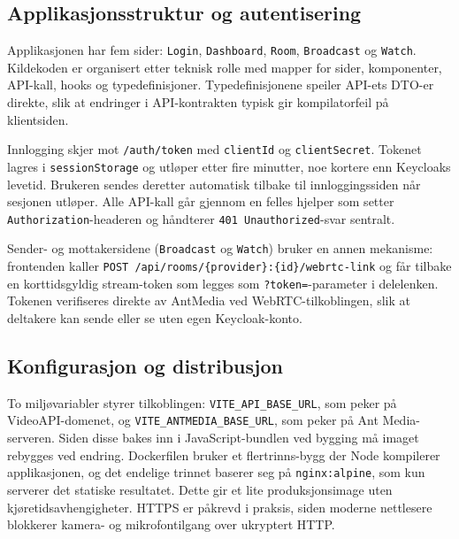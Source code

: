 \subsection{Applikasjonsstruktur og autentisering}
\label{subsec:demo-struktur}

Applikasjonen har fem sider: \texttt{Login}, \texttt{Dashboard}, \texttt{Room},
\texttt{Broadcast} og \texttt{Watch}. Kildekoden er organisert etter teknisk
rolle med mapper for sider, komponenter, API-kall, hooks og typedefinisjoner.
Typedefinisjonene speiler API-ets DTO-er direkte, slik at endringer i
API-kontrakten typisk gir kompilatorfeil på klientsiden.

Innlogging skjer mot \texttt{/auth/token} med \texttt{clientId} og \texttt{clientSecret}. Tokenet lagres i \texttt{sessionStorage} og utløper etter fire minutter, noe kortere enn Keycloaks levetid. Brukeren sendes deretter automatisk tilbake til innloggingssiden når sesjonen utløper. Alle API-kall går gjennom en felles hjelper som setter \texttt{Authorization}-headeren og håndterer \texttt{401 Unauthorized}-svar sentralt.

Sender- og mottakersidene (\texttt{Broadcast} og \texttt{Watch}) bruker en
annen mekanisme: frontenden kaller
\texttt{POST /api/rooms/\{provider\}:\{id\}/webrtc-link} og får tilbake en
korttidsgyldig stream-token som legges som \texttt{?token=}-parameter i
delelenken. Tokenen verifiseres direkte av AntMedia ved WebRTC-tilkoblingen,
slik at deltakere kan sende eller se uten egen Keycloak-konto.

\subsection{Konfigurasjon og distribusjon}
\label{subsec:demo-deploy}

To miljøvariabler styrer tilkoblingen: \texttt{VITE\_API\_BASE\_URL}, som peker på VideoAPI-domenet, og \texttt{VITE\_ANTMEDIA\_BASE\_URL}, som peker på Ant Media-serveren.
Siden disse bakes inn i JavaScript-bundlen ved bygging må imaget rebygges ved
endring. Dockerfilen bruker et flertrinns-bygg der Node kompilerer applikasjonen, og det endelige trinnet baserer seg på \texttt{nginx:alpine}, som kun serverer det statiske resultatet. Dette gir et lite produksjonsimage uten kjøretidsavhengigheter. HTTPS er påkrevd i praksis, siden moderne nettlesere blokkerer kamera- og mikrofontilgang over ukryptert HTTP.